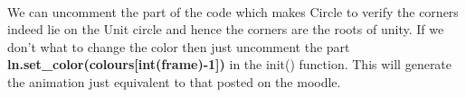 \documentclass[11pt]{article}
\begin{document}
    \begin{center}
    \end{center}
    { \hspace*{\fill} \\}
    
    We can uncomment the part of the code which makes Circle to verify the
corners indeed lie on the Unit circle and hence the corners are the
roots of unity. If we don't what to change the color then just uncomment
the part \textbf{ln.set\_color(colours{[}int(frame)-1{]})} in the init()
function. This will generate the animation just equivalent to that
posted on the moodle.


    
    
    
\end{document}
